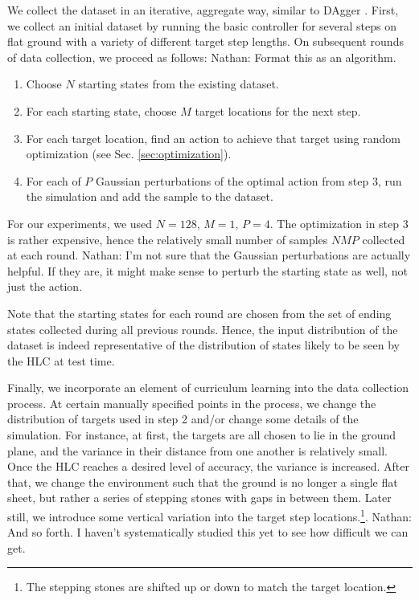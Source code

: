 \documentclass[a4paper]{article}
\newcommand{\nhatch}[1]{{\leavevmode\color{blue} Nathan: #1}}
\begin{document}
We collect the dataset in an iterative, aggregate way, similar to DAgger \citep{ross2011reduction}.
First, we collect an initial dataset by running the basic controller for several steps on flat ground with a variety of different target step lengths.
On subsequent rounds of data collection, we proceed as follows:
\nhatch{Format this as an algorithm.}
\begin{enumerate}
  \item Choose $N$ starting states from the existing dataset.
  \item For each starting state, choose $M$ target locations for the next step.
  \item For each target location, find an action to achieve that target using random optimization (see Sec. \ref{sec:optimization}).
  \item For each of $P$ Gaussian perturbations of the optimal action from step 3, run the simulation and add the sample to the dataset.
\end{enumerate}
For our experiments, we used $N=128$, $M=1$, $P=4$.
The optimization in step 3 is rather expensive, hence the relatively small number of samples $NMP$ collected at each round.
\nhatch{I'm not sure that the Gaussian perturbations are actually helpful. If they are, it might make sense to perturb the starting state as well, not just the action.}

Note that the starting states for each round are chosen from the set of ending states collected during all previous rounds.
Hence, the input distribution of the dataset is indeed representative of the distribution of states likely to be seen by the HLC at test time.

Finally, we incorporate an element of curriculum learning into the data collection process.
At certain manually specified points in the process, we change the distribution of targets used in step 2 and/or change some details of the simulation.
For instance, at first, the targets are all chosen to lie in the ground plane, and the variance in their distance from one another is relatively small.
Once the HLC reaches a desired level of accuracy, the variance is increased.
After that, we change the environment such that the ground is no longer a single flat sheet, but rather a series of stepping stones with gaps in between them.
Later still, we introduce some vertical variation into the target step locations.\footnote{The stepping stones are shifted up or down to match the target location.}.
\nhatch{And so forth. I haven't systematically studied this yet to see how difficult we can get.}
\end{document}
